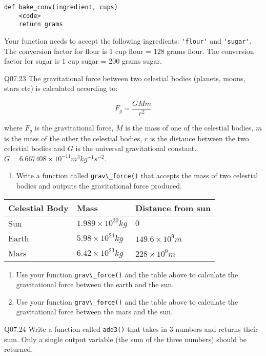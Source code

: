 \documentclass{book}
\providecommand{\tightlist}{%
      \setlength{\itemsep}{0pt}\setlength{\parskip}{0pt}}
\newcommand{\passthrough}[1]{#1}
\begin{document}
\begin{lstlisting}
def bake_conv(ingredient, cups)
    <code>
    return grams
\end{lstlisting}

Your function needs to accept the following ingredients:
\passthrough{\lstinline!'flour'!} and \passthrough{\lstinline!'sugar'!}.
The conversion factor for flour is 1 cup flour = 128 grams flour. The
conversion factor for sugar is 1 cup sugar = 200 grams sugar.

Q07.23 The gravitational force between two celestial bodies (planets,
moons, stars etc) is calculated according to:

\[ F_g = \frac{GMm}{r^2} \]

where \(F_g\) is the gravitational force, \(M\) is the mass of one of
the celestial bodies, \(m\) is the mass of the other the celestial
bodies, \(r\) is the distance between the two celestial bodies and \(G\)
is the universal gravitational constant.
\(G=6.667408 \times 10^{-11} m^3 kg^{-1}s^{-2}\).

\begin{enumerate}
\def\labelenumi{(\alph{enumi})}
\tightlist
\item
  Write a function called \passthrough{\lstinline!grav\_force()!} that
  accepts the mass of two celestial bodies and outputs the gravitational
  force produced.
\end{enumerate}

\begin{longtable}[]{@{}lll@{}}
\toprule
Celestial Body & Mass & Distance from sun\tabularnewline
\midrule
\endhead
Sun & \(1.989\times10^{30} kg\) & \(0\)\tabularnewline
Earth & \(5.98\times10^{24} kg\) &
\(149.6 \times 10^9 m\)\tabularnewline
Mars & \(6.42\times10^{23} kg\) & \(228 \times 10^9 m\)\tabularnewline
\bottomrule
\end{longtable}

\begin{enumerate}
\def\labelenumi{(\alph{enumi})}
\setcounter{enumi}{1}
\item
  Use your function \passthrough{\lstinline!grav\_force()!} and the
  table above to calculate the gravitational force between the earth and
  the sun.
\item
  Use your function \passthrough{\lstinline!grav\_force()!} and the
  table above to calculate the gravitational force between the mars and
  the sun.
\end{enumerate}

Q07.24 Write a function called \passthrough{\lstinline!add3()!} that
takes in 3 numbers and returns their sum. Only a single output variable
(the sum of the three numbers) should be returned.
\end{document}
